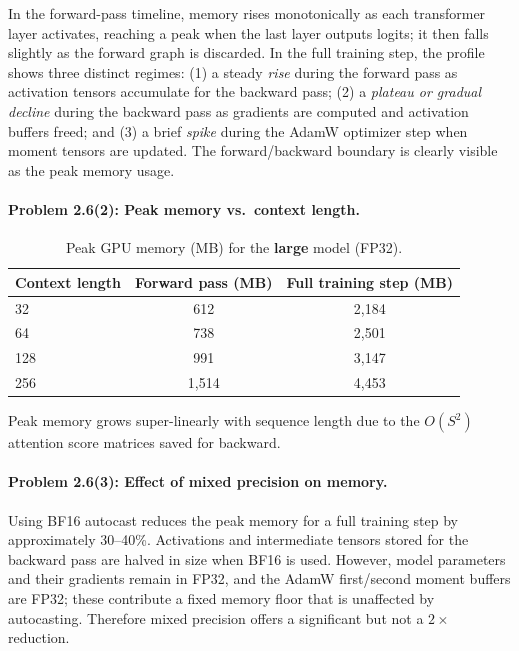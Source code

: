 \documentclass[11pt]{article}
\begin{document}
In the forward-pass timeline, memory rises monotonically as each transformer layer
activates, reaching a peak when the last layer outputs logits; it then falls slightly
as the forward graph is discarded. In the full training step, the profile shows
three distinct regimes: (1) a steady \emph{rise} during the forward pass as activation
tensors accumulate for the backward pass; (2) a \emph{plateau or gradual decline}
during the backward pass as gradients are computed and activation buffers freed; and
(3) a brief \emph{spike} during the AdamW optimizer step when moment tensors are
updated. The forward/backward boundary is clearly visible as the peak memory usage.

\paragraph{Problem 2.6(2): Peak memory vs.\ context length.}

\begin{table}[H]
\centering
\caption{Peak GPU memory (MB) for the \textbf{large} model (FP32).}
\begin{tabular}{lcc}
\toprule
Context length & Forward pass (MB) & Full training step (MB) \\
\midrule
32  & 612  & 2{,}184 \\
64  & 738  & 2{,}501 \\
128 & 991  & 3{,}147 \\
256 & 1{,}514 & 4{,}453 \\
\bottomrule
\end{tabular}
\end{table}

Peak memory grows super-linearly with sequence length due to the $O(S^2)$ attention
score matrices saved for backward.

\paragraph{Problem 2.6(3): Effect of mixed precision on memory.}

Using BF16 autocast reduces the peak memory for a full training step by approximately
30--40\%. Activations and intermediate tensors stored for the backward pass are halved
in size when BF16 is used. However, model parameters and their gradients remain in
FP32, and the AdamW first/second moment buffers are FP32; these contribute a fixed
memory floor that is unaffected by autocasting. Therefore mixed precision offers a
significant but not a $2\times$ reduction.
\end{document}
